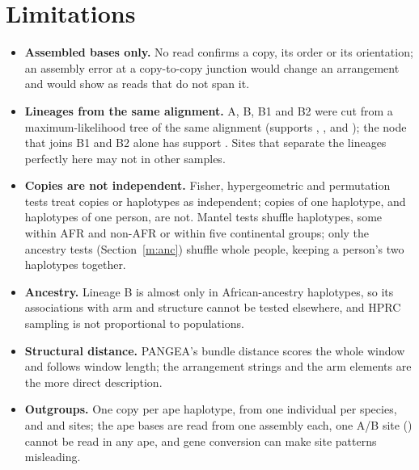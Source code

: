 \documentclass[10pt]{article}
\begin{document}
\section{Limitations}\label{m:lim}
\begin{itemize}
\item \textbf{Assembled bases only.} No read confirms a copy, its order or its orientation; an assembly error at a
copy-to-copy junction would change an arrangement and would show as reads that do not span it.
\item \textbf{Lineages from the same alignment.} A, B, B1 and B2 were cut from a maximum-likelihood tree of the same
alignment (supports \mlIsup, \mlIIsup, \mlBhSup{} and \mlEightSup); the node that joins B1 and B2 alone has support \mlBBjoinSup. Sites that separate
the lineages perfectly here may not in other samples.
\item \textbf{Copies are not independent.} Fisher, hypergeometric and permutation tests treat copies or haplotypes as independent;
copies of one haplotype, and haplotypes of one person, are not. Mantel tests shuffle haplotypes, some within AFR and non-AFR or within five continental groups; only the ancestry tests (Section~\ref{m:anc}) shuffle
whole people, keeping a person's two haplotypes together.
\item \textbf{Ancestry.} Lineage B is almost only in African-ancestry haplotypes, so its associations with arm and
structure cannot be tested elsewhere, and HPRC sampling is not proportional to populations.
\item \textbf{Structural distance.} PANGEA's bundle distance scores the whole window and follows window length; the
arrangement strings and the arm elements are the more direct description.
\item \textbf{Outgroups.} One copy per ape haplotype, from one individual per species, and \evS{} and \evAB{} sites;
the ape bases are read from one assembly each, one A/B site (\rdUnresSite) cannot be read in any ape, and gene conversion can make site patterns misleading.
\end{itemize}
\end{document}
